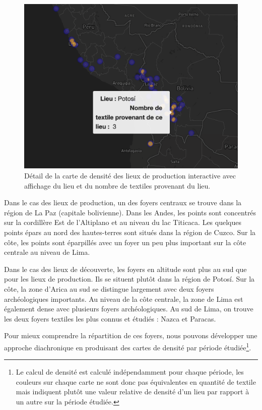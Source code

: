  \begin{figure}[!h]
	\begin{center}
		\includegraphics[width=12cm]{../images/heatmap_leaflet.png}
		\caption{Détail de la carte de densité des lieux de production interactive avec affichage du lieu et du nombre de textiles provenant du lieu.}
		\label{fig:leaflet_density}
	 \end{center}
\end{figure}

Dans le cas des lieux de production, un des foyers centraux se trouve dans la région de La Paz (capitale bolivienne). Dans les Andes, les points sont concentrés sur la cordillère Est de l'Altiplano et au niveau du lac Titicaca. Les quelques points épars au nord des hautes-terres sont situés dans la région de Cuzco. Sur la côte, les points sont éparpillés avec un foyer un peu plus important sur la côte centrale au niveau de Lima. 

Dans le cas des lieux de découverte, les foyers en altitude sont plus au sud que pour les lieux de production. Ils se situent plutôt dans la région de Potosí. Sur la côte, la zone d'Arica au sud se distingue largement avec deux foyers archéologiques importants. Au niveau de la côte centrale, la zone de Lima est également dense avec plusieurs foyers archéologiques. Au sud de Lima, on trouve les deux foyers textiles les plus connus et étudiés : Nazca et Paracas.

Pour mieux comprendre la répartition de ces foyers, nous pouvons développer une approche diachronique en produisant des cartes de densité par période étudiée\footnote{Le calcul de densité est calculé indépendamment pour chaque période, les couleurs sur chaque carte ne sont donc pas équivalentes en quantité de textile mais indiquent plutôt une valeur relative de densité d'un lieu par rapport à un autre sur la période étudiée.}. 

